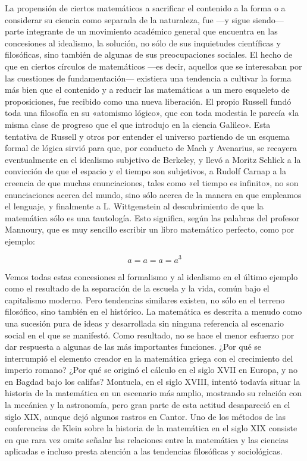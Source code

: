 \documentclass[a4paper, 12pt]{article}
\begin{document}
{{La propensión de ciertos matemáticos a sacrificar el contenido a la forma o a
considerar su ciencia como separada de la naturaleza, fue ---y sigue siendo---
parte integrante de un movimiento académico general que encuentra en las
concesiones al idealismo, la solución, no sólo de sus inquietudes científicas y
filosóficas, sino también de algunas de sus preocupaciones sociales. El hecho de
que en ciertos círculos de matemáticos ---es decir, aquellos que se interesaban
por las cuestiones de fundamentación--- existiera una tendencia a cultivar la
forma más bien que el contenido y a reducir las matemáticas a un mero esqueleto
de proposiciones, fue recibido como una nueva liberación. El propio Russell
fundó toda una filosofía en su «atomismo lógico», que con toda modestia le
parecía «la misma clase de progreso que el que introdujo en la ciencia Galileo».
Esta tentativa de Russell y otros por entender el universo partiendo de un
esquema formal de lógica sirvió para que, por conducto de Mach y Avenarius, se
recayera eventualmente en el idealismo subjetivo de Berkeley, y llevó a Moritz
Schlick a la convicción de que el espacio y el tiempo son subjetivos, a Rudolf
Carnap a la creencia de que muchas enunciaciones, tales como «el tiempo es
infinito», no son enunciaciones acerca del mundo, sino sólo acerca de la manera
en que empleamos el lenguaje, y finalmente a L. Wittgenstein al descubrimiento
de que la matemática sólo es una tautología. Esto significa, según las palabras
del profesor Mannoury, que es muy sencillo escribir un libro matemático
perfecto, como por ejemplo:

\[ a = a = a = a^3 \]

Vemos todas estas concesiones al formalismo y al idealismo en el último ejemplo
como el resultado de la separación de la escuela y la vida, común bajo el
capitalismo moderno. Pero tendencias similares existen, no sólo en el terreno
filosófico, sino también en el histórico. La matemática es descrita a menudo
como una sucesión pura de ideas y desarrollada sin ninguna referencia al
escenario social en el que se manifestó. Como resultado, no se hace el menor
esfuerzo por dar respuesta a algunas de las más importantes funciones. ¿Por qué
se interrumpió el elemento creador en la matemática griega con el crecimiento
del imperio romano? ¿Por qué se originó el cálculo en el siglo XVII en Europa, y
no en Bagdad bajo los califas? Montucla, en el siglo XVIII, intentó todavía
situar la historia de la matemática en un escenario más amplio, mostrando su
relación con la mecánica y la astronomía, pero gran parte de esta actitud
desapareció en el siglo XIX, aunque dejó algunos rastros en Cantor. Uno de los
métodos de las conferencias de Klein sobre la historia de la matemática en el
siglo XIX consiste en que rara vez omite señalar las relaciones entre la
matemática y las ciencias aplicadas e incluso presta atención a las tendencias
filosóficas y sociológicas.

}}
\end{document}
